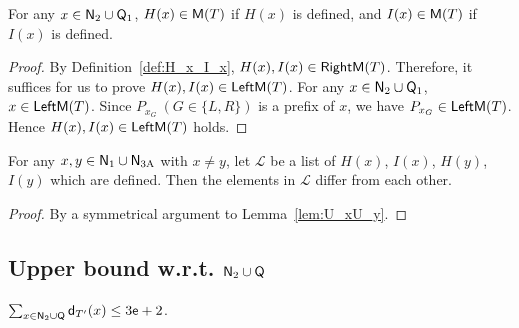   \begin{lemma} \label{lem:H_x_I_x}
    For any $x \in \mathsf{N}_{\mathrm{2}} \cup \mathsf{Q}_{\mathrm{1}}$, $H(x) \in \mathsf{M}(T)$ if $H(x)$ is defined,
    and $I(x) \in \mathsf{M}(T)$ if $I(x)$ is defined.
  \end{lemma}
  

  \begin{proof}
    By Definition~\ref{def:H_x_I_x}, $H(x), I(x)\in \mathsf{RightM}(T)$.
    Therefore, it suffices for us to prove $H(x), I(x)\in \mathsf{LeftM}(T)$.
    For any $x \in \mathsf{N}_{\mathrm{2}} \cup \mathsf{Q}_{\mathrm{1}}$, $x \in \mathsf{LeftM}(T)$.
    Since $P_{x_G} \: (G \in \{L,R\})$ is a prefix of $x$,
    we have $P_{x_G} \in \mathsf{LeftM}(T)$.
    Hence $H(x), I(x)\in \mathsf{LeftM}(T)$ holds.
  \end{proof}

  \begin{lemma} \label{lem:H_xH_y}
    For any $x,y \in \mathsf{N}_{\mathrm{1}} \cup \mathsf{N}_{\mathrm{3A}}$ with $x \neq y$,
    let $\mathcal{L}$ be a list of $H(x)$, $I(x)$, $H(y)$, $I(y)$
    which are defined.
    Then the elements in $\mathcal{L}$ differ from each other.
  \end{lemma}

  \begin{proof}
    By a symmetrical argument to Lemma~\ref{lem:U_xU_y}.
  \end{proof}

  \subsection{Upper bound w.r.t. $\mathsf{N}_{\mathrm{2}} \cup \mathsf{Q}$}

  \begin{lemma} 
    \label{lem:dt2}
    $\sum_{x \in \mathsf{N}_{\mathrm{2}} \cup \mathsf{Q}}\mathsf{d}_{T'}(x) \le 3\mathsf{e}+2$.
  \end{lemma}

